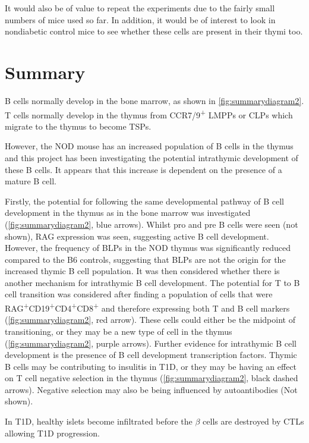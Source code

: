 It would also be of value to repeat the experiments due to the fairly small numbers of mice used so far.
In addition, it would be of interest to look in nondiabetic control mice to see whether these cells are present in their thymi too.



\section{Summary}

B cells normally develop in the bone marrow, as shown in \cref{fig:summarydiagram2}.
T cells normally develop in the thymus from CCR7/9\textsuperscript{+} LMPPs or CLPs which migrate to the thymus to become TSPs.

However, the NOD mouse has an increased population of B cells in the thymus and this project has been investigating the potential intrathymic development of these B cells.
It appears that this increase is dependent on the presence of a mature B cell.

Firstly, the potential for following the same developmental pathway of B cell development in the thymus as in the bone marrow was investigated (\cref{fig:summarydiagram2}, blue arrows).
Whilst pro and pre B cells were seen (not shown), RAG expression was seen, suggesting active B cell development.
However, the frequency of BLPs in the NOD thymus was significantly reduced compared to the B6 controls, suggesting that BLPs are not the origin for the increased thymic B cell population.
It was then considered whether there is another mechanism for intrathymic B cell development.
The potential for T to B cell transition was considered after finding a population of cells that were RAG\textsuperscript{+}CD19\textsuperscript{+}CD4\textsuperscript{+}CD8\textsuperscript{+} and therefore expressing both T and B cell markers (\cref{fig:summarydiagram2}, red arrow).
These cells could either be the midpoint of transitioning, or they may be a new type of cell in the thymus (\cref{fig:summarydiagram2}, purple arrows).
Further evidence for intrathymic B cell development is the presence of B cell development transcription factors.
Thymic B cells may be contributing to insulitis in T1D, or they may be having an effect on T cell negative selection in the thymus (\cref{fig:summarydiagram2}, black dashed arrows).
Negative selection may also be being influenced by autoantibodies (Not shown).

In T1D, healthy islets become infiltrated before the $\beta$ cells are destroyed by CTLs allowing T1D progression.


